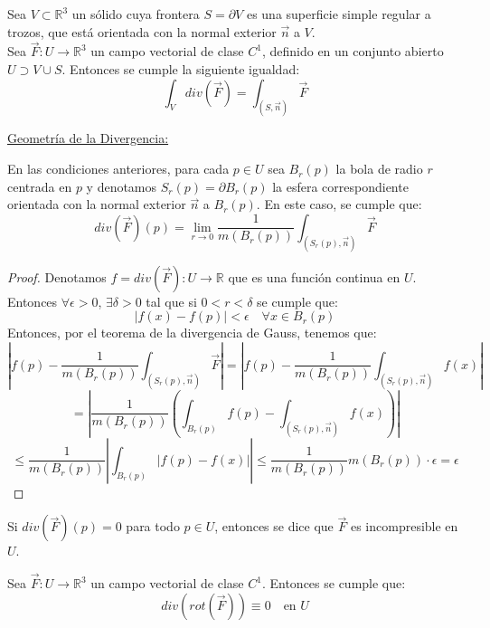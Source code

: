 \begin{teorema} 
    Sea $V \subset \mathbb{R}^3$ un sólido cuya frontera $S = \partial V$ es una superficie simple regular a trozos, que está orientada con la normal exterior $\vec{n}$ a $V$.\\
    Sea $\vec{F} : U \to \mathbb{R}^3$ un campo vectorial de clase $C^1$, definido en un conjunto abierto $U \supset V \cup S$. Entonces se cumple la siguiente igualdad:
    $$ \int_{V} div(\vec{F}) = \int_{(S, \vec{n})} \vec{F}$$
\end{teorema}

\underline{Geometría de la Divergencia:}\\
\begin{corolario}
    En las condiciones anteriores, para cada $p \in U$ sea $B_r(p)$ la bola de radio $r$ centrada en $p$ y denotamos $S_r(p) = \partial B_r(p)$ la esfera correspondiente orientada con la normal exterior $\vec{n}$ a $B_r(p)$. En este caso, se cumple que:
    $$ div(\vec{F})(p) = \lim_{r \to 0} \frac{1}{m(B_r(p))} \int_{(S_r(p), \vec{n})} \vec{F}$$ 
\end{corolario}

\begin{proof}
    Denotamos $f = div(\vec{F}) : U \to \mathbb{R}$ que es una función continua en $U$.\\
    Entonces $\forall \epsilon > 0$, $\exists \delta > 0$ tal que si $0 < r < \delta$ se cumple que:
    $$ \left| f(x) - f(p) \right| < \epsilon \quad \forall x \in B_r(p)$$
    Entonces, por el teorema de la divergencia de Gauss, tenemos que:
    $$ \left| f(p) - \frac{1}{m(B_r(p))} \int_{(S_r(p), \vec{n})} \vec{F} \right| = \left| f(p) - \frac{1}{m(B_r(p))} \int_{(S_r(p), \vec{n})} f(x) \right|$$
    $$ = \left| \frac{1}{m(B_r(p))} \left( \int_{B_r(p)} f(p) - \int_{(S_r(p), \vec{n})} f(x) \right) \right|$$
    $$ \leq \frac{1}{m(B_r(p))} \left| \int_{B_r(p)} \left| f(p) - f(x) \right| \right| \leq \frac{1}{m(B_r(p))} m(B_r(p)) \cdot \epsilon = \epsilon$$
\end{proof}

\begin{observación}
    Si $div(\vec{F})(p) = 0$ para todo $p \in U$, entonces se dice que $\vec{F}$ es incompresible en $U$.
\end{observación}

\begin{observación}
    Sea $\vec{F} : U \to \mathbb{R}^3$ un campo vectorial de clase $C^1$. Entonces se cumple que:
    $$ div(rot(\vec{F})) \equiv 0 \quad \text{en } U$$
\end{observación}

